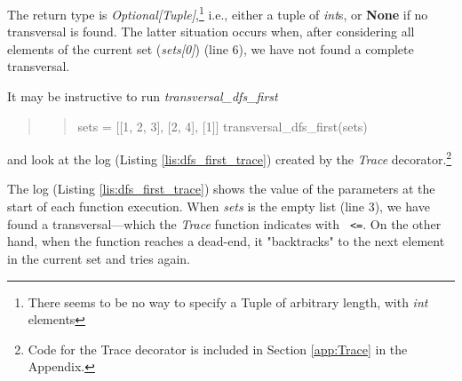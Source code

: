 The return type is \textit{Optional[Tuple]},\footnote{There seems to be no way to specify a Tuple of arbitrary length, with \textit{int} elements} i.e., either a tuple of \textit{int}s, or \textbf{None} if no transversal is found. The latter situation occurs when, after considering all elements of the current set (\textit{sets[0]}) (line 6), we have not found a complete transversal.  


It may be instructive to run \textit{transversal\_dfs\_first}
\begin{quote}
\begin{quote}
\begin{python}
sets = [[1, 2, 3], [2, 4], [1]]
transversal_dfs_first(sets)
\end{python}
\end{quote}
\end{quote}
and look at the log (Listing \ref{lis:dfs_first_trace}) created by the \textit{Trace} decorator.\footnote{Code for the Trace decorator is included in Section \ref{app:Trace} in the Appendix.} 

The log (Listing \ref{lis:dfs_first_trace}) shows the value of the parameters at the start of each function execution. When \textit{sets} is the empty list (line 3), we have found a transversal---which the \textit{Trace} function indicates with \texttt{ <=}. On the other hand, when the function reaches a dead-end, it "backtracks" to the next element in the current set and tries again. 


